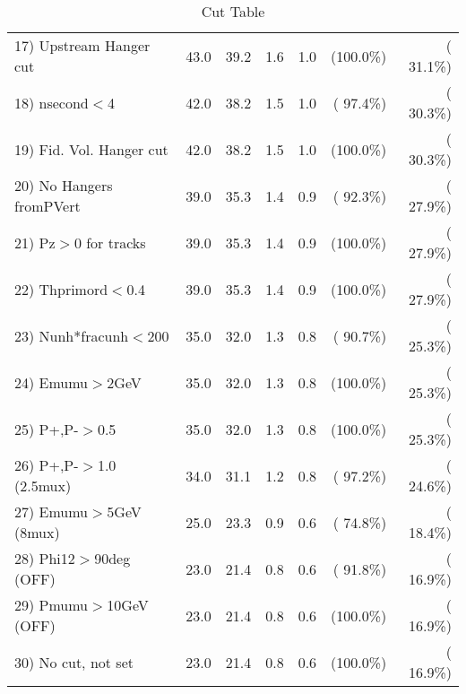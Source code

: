 \begin{table}[h!]
\begin{tabular}{||l||r|r|r|r|r|r||}
 17) Upstream Hanger cut  &         43.0 &         39.2 &          1.6 &          1.0 & (100.0\%) & ( 31.1\%) \\
 18) nsecond$<$4          &         42.0 &         38.2 &          1.5 &          1.0 & ( 97.4\%) & ( 30.3\%) \\
 19) Fid. Vol. Hanger cut &         42.0 &         38.2 &          1.5 &          1.0 & (100.0\%) & ( 30.3\%) \\
 20) No Hangers fromPVert &         39.0 &         35.3 &          1.4 &          0.9 & ( 92.3\%) & ( 27.9\%) \\
 21) Pz$>$0 for tracks    &         39.0 &         35.3 &          1.4 &          0.9 & (100.0\%) & ( 27.9\%) \\
 22) Thprimord$<$0.4      &         39.0 &         35.3 &          1.4 &          0.9 & (100.0\%) & ( 27.9\%) \\
 23) Nunh*fracunh$<$200   &         35.0 &         32.0 &          1.3 &          0.8 & ( 90.7\%) & ( 25.3\%) \\
 24) Emumu$>$2GeV         &         35.0 &         32.0 &          1.3 &          0.8 & (100.0\%) & ( 25.3\%) \\
 25) P+,P-$>$0.5          &         35.0 &         32.0 &          1.3 &          0.8 & (100.0\%) & ( 25.3\%) \\
 26) P+,P-$>$1.0 (2.5mux) &         34.0 &         31.1 &          1.2 &          0.8 & ( 97.2\%) & ( 24.6\%) \\
 27) Emumu$>$5GeV  (8mux) &         25.0 &         23.3 &          0.9 &          0.6 & ( 74.8\%) & ( 18.4\%) \\
 28) Phi12$>$90deg  (OFF) &         23.0 &         21.4 &          0.8 &          0.6 & ( 91.8\%) & ( 16.9\%) \\
 29) Pmumu$>$10GeV  (OFF) &         23.0 &         21.4 &          0.8 &          0.6 & (100.0\%) & ( 16.9\%) \\
 30) No cut, not set      &         23.0 &         21.4 &          0.8 &          0.6 & (100.0\%) & ( 16.9\%) \\
 \hline
 \hline
 \end{tabular}
 \caption{Cut Table           }
 \label{tab-cutcohjpsi-mumu_cohrho0}
 \end{table}
